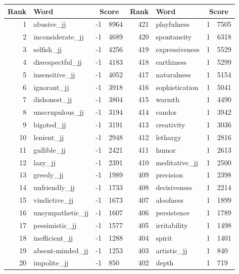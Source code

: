 \begin{table}[tbp]
    \begin{tabular}{| rlr@{.}l | rlr@{.}l |}
    \hline
    \textbf{Rank} & \textbf{Word} & \multicolumn{2}{c|}{\textbf{Score}} & \textbf{Rank} & \textbf{Word} & \multicolumn{2}{c|}{\textbf{Score}} \\
    \hline
    1 & abusive\_jj & -1 & 8964    &    421 & playfulness & 1 & 7505 \\
    2 & inconsiderate\_jj & -1 & 4689    &    420 & spontaneity & 1 & 6318 \\
    3 & selfish\_jj & -1 & 4256    &    419 & expressiveness & 1 & 5529 \\
    4 & disrespectful\_jj & -1 & 4183    &    418 & earthiness & 1 & 5299 \\
    5 & insensitive\_jj & -1 & 4052    &    417 & naturalness & 1 & 5154 \\
    6 & ignorant\_jj & -1 & 3918    &    416 & sophistication & 1 & 5041 \\
    7 & dishonest\_jj & -1 & 3804    &    415 & warmth & 1 & 4490 \\
    8 & unscrupulous\_jj & -1 & 3194    &    414 & candor & 1 & 3942 \\
    9 & bigoted\_jj & -1 & 3191    &    413 & creativity & 1 & 3036 \\
    10 & lenient\_jj & -1 & 2948    &    412 & lethargy & 1 & 2816 \\
    11 & gullible\_jj & -1 & 2421    &    411 & humor & 1 & 2613 \\
    12 & lazy\_jj & -1 & 2391    &    410 & meditative\_jj & 1 & 2500 \\
    13 & greedy\_jj & -1 & 1989    &    409 & precision & 1 & 2398 \\
    14 & unfriendly\_jj & -1 & 1733    &    408 & decisiveness & 1 & 2214 \\
    15 & vindictive\_jj & -1 & 1673    &    407 & aloofness & 1 & 1899 \\
    16 & unsympathetic\_jj & -1 & 1607    &    406 & persistence & 1 & 1789 \\
    17 & pessimistic\_jj & -1 & 1577    &    405 & irritability & 1 & 1498 \\
    18 & inefficient\_jj & -1 & 1288    &    404 & spirit & 1 & 1401 \\
    19 & absent-minded\_jj & -1 & 1253    &    403 & artistic\_jj & 1 & 840 \\
    20 & impolite\_jj & -1 & 850    &    402 & depth & 1 & 719 \\

\end{tabular}
\end{table}
